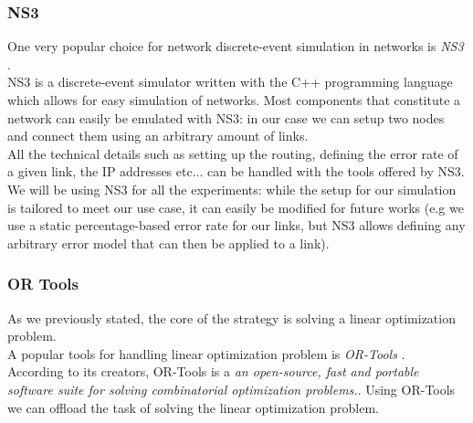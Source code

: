 \subsubsection{NS3}
One very popular choice for network discrete-event simulation in networks is \textit{NS3} \cite{ns3}. \\
NS3 is a discrete-event simulator written with the C++ programming language which allows for easy simulation of networks.
Most components that constitute a network can easily be emulated with NS3: in our case we can setup two nodes and connect them using an arbitrary amount of links. \\

All the technical details such as setting up the routing, defining the error rate of a given link, the IP addresses etc... can be handled with the tools offered by NS3. \\

We will be using NS3 for all the experiments: while the setup for our simulation is tailored to meet our use case, it can easily be modified for future works (e.g we use a static percentage-based error rate for our links, but NS3 allows defining any arbitrary error model that can then be applied to a link).


\subsubsection{OR Tools}
As we previously stated, the core of the strategy is solving a linear optimization problem. \\
A popular tools for handling linear optimization problem is \textit{OR-Tools} \cite{or-tools}. \\
According to its creators, OR-Tools is a \textit{an open-source, fast and portable software suite for solving combinatorial optimization problems.}.
Using OR-Tools we can offload the task of solving the linear optimization problem.

